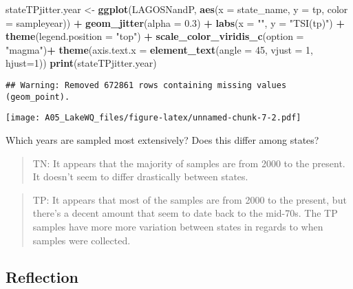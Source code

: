 \documentclass[]{article}
\newenvironment{Shaded}{\begin{snugshade}}{\end{snugshade}}
\newcommand{\DataTypeTok}[1]{\textcolor[rgb]{0.13,0.29,0.53}{#1}}
\newcommand{\DecValTok}[1]{\textcolor[rgb]{0.00,0.00,0.81}{#1}}
\newcommand{\FloatTok}[1]{\textcolor[rgb]{0.00,0.00,0.81}{#1}}
\newcommand{\KeywordTok}[1]{\textcolor[rgb]{0.13,0.29,0.53}{\textbf{#1}}}
\newcommand{\NormalTok}[1]{#1}
\newcommand{\OperatorTok}[1]{\textcolor[rgb]{0.81,0.36,0.00}{\textbf{#1}}}
\newcommand{\StringTok}[1]{\textcolor[rgb]{0.31,0.60,0.02}{#1}}
\begin{document}
\begin{Shaded}
\begin{Highlighting}[]
\NormalTok{stateTPjitter.year <-}\StringTok{ }\KeywordTok{ggplot}\NormalTok{(LAGOSNandP, }\KeywordTok{aes}\NormalTok{(}\DataTypeTok{x =}\NormalTok{ state_name, }\DataTypeTok{y =}\NormalTok{ tp, }\DataTypeTok{color =}\NormalTok{ sampleyear)) }\OperatorTok{+}
\StringTok{ }\KeywordTok{geom_jitter}\NormalTok{(}\DataTypeTok{alpha =} \FloatTok{0.3}\NormalTok{) }\OperatorTok{+}
\StringTok{  }\KeywordTok{labs}\NormalTok{(}\DataTypeTok{x =} \StringTok{""}\NormalTok{, }\DataTypeTok{y =} \StringTok{"TSI(tp)"}\NormalTok{) }\OperatorTok{+}
\StringTok{  }\KeywordTok{theme}\NormalTok{(}\DataTypeTok{legend.position =} \StringTok{"top"}\NormalTok{) }\OperatorTok{+}
\StringTok{  }\KeywordTok{scale_color_viridis_c}\NormalTok{(}\DataTypeTok{option =} \StringTok{"magma"}\NormalTok{)}\OperatorTok{+}
\StringTok{  }\KeywordTok{theme}\NormalTok{(}\DataTypeTok{axis.text.x =} \KeywordTok{element_text}\NormalTok{(}\DataTypeTok{angle =} \DecValTok{45}\NormalTok{, }\DataTypeTok{vjust =} \DecValTok{1}\NormalTok{, }\DataTypeTok{hjust=}\DecValTok{1}\NormalTok{))}
\KeywordTok{print}\NormalTok{(stateTPjitter.year)}
\end{Highlighting}
\end{Shaded}

\begin{verbatim}
## Warning: Removed 672861 rows containing missing values (geom_point).
\end{verbatim}

\texttt{[image: A05\_LakeWQ\_files/figure-latex/unnamed-chunk-7-2.pdf]}

Which years are sampled most extensively? Does this differ among states?

\begin{quote}
TN: It appears that the majority of samples are from 2000 to the
present. It doesn't seem to differ drastically between states.
\end{quote}

\begin{quote}
TP: It appears that most of the samples are from 2000 to the present,
but there's a decent amount that seem to date back to the mid-70s. The
TP samples have more more variation between states in regards to when
samples were collected.
\end{quote}

\hypertarget{reflection}{%
\subsection{Reflection}\label{reflection}}
\end{document}
